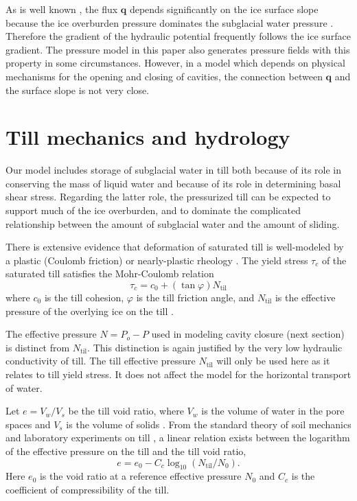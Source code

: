\documentclass[gmd]{copernicus}   %
\newcommand{\text}{\textrm}
\newcommand\bq{\mathbf{q}}
\begin{document}
As is well known \citep{Clarke05}, the flux $\bq$ depends significantly on the ice surface slope because the ice overburden pressure dominates the subglacial water pressure \citep{Shreve1972}.  Therefore the gradient of the hydraulic potential frequently follows the ice surface gradient.  The pressure model in this paper also generates pressure fields with this property in some circumstances.  However, in a model which depends on physical mechanisms for the opening and closing of cavities, the connection between $\bq$ and the surface slope is not very close.


\section{Till mechanics and hydrology} \label{sec:tillmechanics}

Our model includes storage of subglacial water in till both because of its role in conserving the mass of liquid water and because of its role in determining basal shear stress.  Regarding the latter role, the pressurized till can be expected to support much of the ice overburden, and to dominate the complicated relationship between the amount of subglacial water and the amount of sliding.

There is extensive evidence that deformation of saturated till is well-modeled by a plastic (Coulomb friction) or nearly-plastic rheology \citep{Hookeetal1997,SchoofTill,TrufferHarrisonEchelmeyer2000,Tulaczyketal2000}.  The yield stress $\tau_c$ of the saturated till satisfies the Mohr-Coulomb relation
\newcommand{\Ntil}{N_{\text{til}}}
\begin{equation}
\tau_c = c_0 + (\tan \varphi) \Ntil  \label{eq:mohrcoulomb}
\end{equation}
where $c_0$ is the till cohesion, $\varphi$ is the till friction angle, and $\Ntil$ is the effective pressure of the overlying ice on the till \citep{CuffeyPaterson}.

The effective pressure $N=P_o-P$ used in modeling cavity closure (next section) is distinct from $\Ntil$.  This distinction is again justified by the very low hydraulic conductivity of till.  The till effective pressure $\Ntil$ will only be used here as it relates to till yield stress.  It does not affect the model for the horizontal transport of water.

Let $e = V_w / V_s$ be the till void ratio, where $V_w$ is the volume of water in the pore spaces and $V_s$ is the volume of solids \citep{Tulaczyketal2000}.  From the standard theory of soil mechanics and laboratory experiments on till \citep{Hookeetal1997,Tulaczyketal2000}, a linear relation exists between the logarithm of the effective pressure on the till and the till void ratio,
\begin{equation}
e = e_0 - C_c \log_{10}\left(\Ntil / N_0\right).  \label{eq:voidpressure}
\end{equation}
Here $e_0$ is the void ratio at a reference effective pressure $N_0$ and $C_c$ is the coefficient of compressibility of the till.
\end{document}
